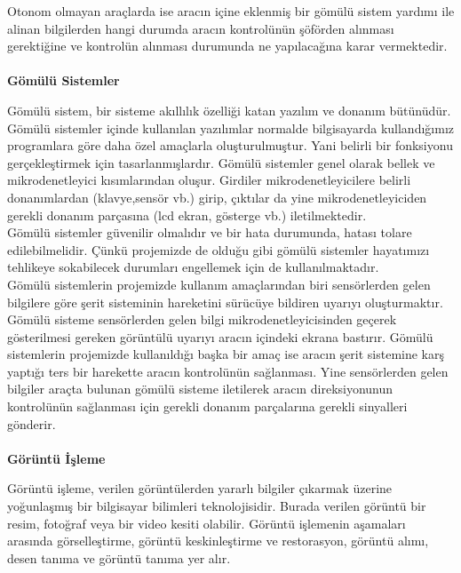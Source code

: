 \documentclass[12pt,a4paper]{report}
\begin{document}
Otonom olmayan araçlarda ise aracın içine eklenmiş bir gömülü sistem yardımı ile alinan bilgilerden hangi durumda aracın kontrolünün şöförden alınması gerektiğine ve kontrolün alınması durumunda ne yapılacağına karar vermektedir. \\ \\

{\normalsize\bfseries Gömülü Sistemler \\}

Gömülü sistem, bir sisteme akıllılık özelliği katan yazılım ve donanım bütünüdür. Gömülü sistemler içinde kullanılan yazılımlar normalde bilgisayarda kullandığımız programlara göre daha özel amaçlarla oluşturulmuştur. Yani belirli bir fonksiyonu gerçekleştirmek için tasarlanmışlardır. Gömülü sistemler genel olarak bellek ve mikrodenetleyici kısımlarından oluşur. Girdiler mikrodenetleyicilere belirli donanımlardan (klavye,sensör vb.) girip, çıktılar da yine mikrodenetleyiciden gerekli donanım parçasına (lcd ekran, gösterge vb.) iletilmektedir. \\

Gömülü sistemler güvenilir olmalıdır ve bir hata durumunda, hatası tolare edilebilmelidir. Çünkü projemizde de olduğu gibi gömülü sistemler hayatımızı tehlikeye sokabilecek durumları engellemek için de kullanılmaktadır. \\

Gömülü sistemlerin projemizde kullanım amaçlarından biri sensörlerden gelen bilgilere göre şerit sisteminin hareketini sürücüye bildiren uyarıyı oluşturmaktır. Gömülü sisteme sensörlerden gelen bilgi mikrodenetleyicisinden geçerek gösterilmesi gereken görüntülü uyarıyı aracın içindeki ekrana bastırır. Gömülü sistemlerin projemizde kullanıldığı başka bir amaç ise aracın şerit sistemine karş yaptığı ters bir harekette aracın kontrolünün sağlanması. Yine sensörlerden gelen bilgiler araçta bulunan gömülü sisteme iletilerek aracın direksiyonunun kontrolünün sağlanması için gerekli donanım parçalarına gerekli sinyalleri gönderir. \\ \\

{\normalsize\bfseries Görüntü İşleme \\}

Görüntü işleme, verilen görüntülerden yararlı bilgiler çıkarmak üzerine yoğunlaşmış bir bilgisayar bilimleri teknolojisidir. Burada verilen görüntü bir resim, fotoğraf veya bir video kesiti olabilir. Görüntü işlemenin aşamaları arasında görselleştirme, görüntü keskinleştirme ve restorasyon, görüntü alımı, desen tanıma ve görüntü tanıma yer alır. \\ \\
\end{document}
